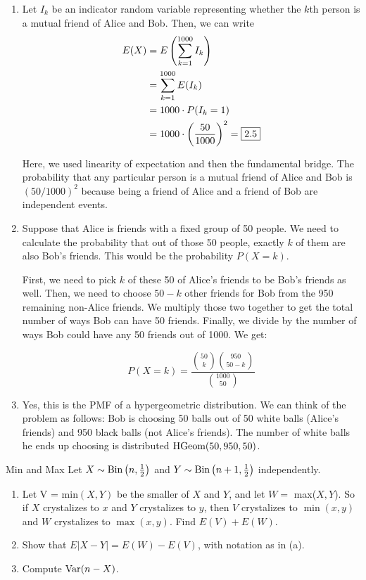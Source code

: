 \documentclass[11pt]{article}
\begin{document}
\begin{solution}{3}
\vspace{-5mm}
\begin{enumerate} 
\item Let $I_k$ be an indicator random variable representing whether the $k$th person is a mutual friend of Alice and Bob. Then, we can write \begin{align*}
E(X) &= E\left( \sum_{k = 1}^{1000} I_k \right) \\ 
&= \sum_{k = 1}^{1000} E(I_k) \\ 
&= 1000 \cdot P(I_k = 1) \\ 
&= 1000 \cdot \left( \frac{50}{1000} \right)^2 = \boxed{2.5}
\end{align*}

Here, we used linearity of expectation and then the fundamental bridge. The probability that any particular person is a mutual friend of Alice and Bob is $(50/1000)^2$ because being a friend of Alice and a friend of Bob are independent events. 
\item Suppose that Alice is friends with a fixed group of 50 people. We need to calculate the probability that out of those 50 people, exactly $k$ of them are also Bob's friends. This would be the probability $P(X = k)$.\vspace{0.2em}

First, we need to pick $k$ of these 50 of Alice's friends to be Bob's friends as well. Then, we need to choose $50-k$ other friends for Bob from the 950 remaining non-Alice friends. We multiply those two together to get the total number of ways Bob can have 50 friends. Finally, we divide by the number of ways Bob could have any 50 friends out of 1000. We get: 

$$ P(X = k) = \frac{{50 \choose k} {950 \choose 50-k}}{{1000 \choose 50}}$$ 

\item Yes, this is the PMF of a hypergeometric distribution. We can think of the problem as follows: Bob is choosing 50 balls out of 50 white balls (Alice's friends) and 950 black balls (not Alice's friends). The number of white balls he ends up choosing is distributed $\textrm{HGeom}(50, 950, 50)$. 
\end{enumerate}
\end{solution}
\newpage
\begin{exercise}{Min and Max} 
Let $X \sim \textrm{Bin} \left(n, \frac{1}{2} \right)$ and $Y \sim \textrm{Bin} \left( n+1, \frac{1}{2} \right)$ independently. 
\begin{enumerate}
\item Let V = min$(X,Y)$ be the smaller of $X$ and $Y$, and let $W = $ max($X,Y$). So if $X$ crystalizes to $x$ and $Y$ crystalizes to $y$, then $V$ crystalizes to $\min(x,y)$ and $W$ crystalizes to $\max(x,y)$. Find $E(V) + E(W)$. 

\item Show that $E|X-Y| = E(W) - E(V)$, with notation as in (a). 

\item Compute $\textrm{Var}(n - X)$. 
\end{enumerate}
\end{exercise}
\end{document}

